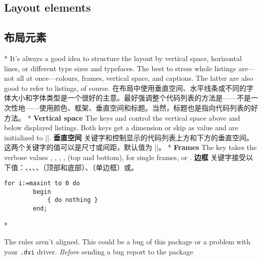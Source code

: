 \begin{paracol}{2}
\subsection{Layout elements}
\switchcolumn
\subsection{布局元素}
\switchcolumn[0]*%
It's always a good idea to structure the layout by vertical space,
horizontal lines, or different type sizes and typefaces. The best to stress
whole listings are---not all at once---colours, frames, vertical space, and
captions. The latter are also good to refer to listings, of course.
\switchcolumn
在布局中使用垂直空间、水平线条或不同的字体大小和字体类型是一个很好的主意。最好强调整个代码列表的方法是——不是一次性地——使用颜色、框架、垂直空间和标题。当然，标题也是指向代码列表的好方法。
\switchcolumn[0]*%
\textbf{Vertical space}
The keys {\rstyle{}} and {\rstyle{}}
control the vertical space above and below displayed listings. Both keys get
a dimension or skip as value and are initialized to |\medskipamount|.
\switchcolumn
\textbf{垂直空间}
关键字{\rstyle{}}和{\rstyle{}}控制显示的代码列表上方和下方的垂直空间。这两个关键字的值可以是尺寸或间距，默认值为 |\medskipamount|。
\switchcolumn[0]*%
\textbf{Frames}
The key  takes the verbose values ,
, , ,
 (top and bottom),  for single frames, or
.
\switchcolumn
\textbf{边框}
关键字接受以下值：、、、、（顶部和底部）、（单边框）或。
\begin{lstsample}[frame]{}{}
        \begin{lstlisting}[frame=single]
        for i:=maxint to 0 do
        begin
            { do nothing }
        end;
        \end{lstlisting}
\end{lstsample}
\switchcolumn[0]*%
\begin{advise}
\item The rules aren't aligned.
     \advisespace
     This could be a bug of this package or a problem with your
     \texttt{.dvi} driver. \emph{Before} sending a bug report to the package

\end{advise}
\end{paracol}
